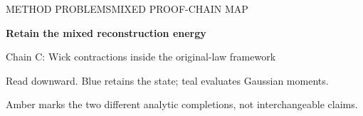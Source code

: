 \documentclass[11pt]{article}
\numberwithin{equation}{section}
\theoremstyle{definition}\newtheorem{definition}[theorem]{Definition}
\theoremstyle{remark}\newtheorem{remark}[theorem]{Remark}
\begin{document}
\clearpage
{}\label{p02:fig:mixedchain}
{\sffamily\color{Navy}\small METHOD PROBLEMS\hfill MIXED PROOF-CHAIN MAP\par}
\vspace{3mm}
{\sffamily\bfseries\fontsize{22}{26}\selectfont Retain the mixed reconstruction energy\par}
\vspace{1.5mm}
{\sffamily\large Chain C: Wick contractions inside the original-law framework\par}
\vspace{2mm}
{\small Read downward. Blue retains the state; teal evaluates Gaussian moments.\par
Amber marks the two different analytic completions, not interchangeable claims.\par}
\vspace{2mm}
\end{document}
